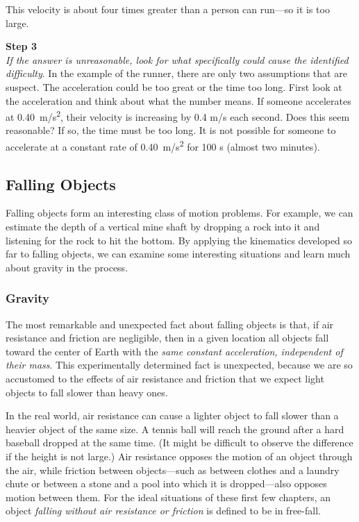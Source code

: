 \documentclass[main-ap-physics.tex]{subfiles}
\begin{document}
This velocity is about four times greater than a person can run---so it is too large.

\vspace{1em}

\textbf{Step 3}\\
\textit{If the answer is unreasonable, look for what specifically could cause the identified difficulty}. In the example of the runner, there are only two assumptions that are suspect. The acceleration could be too great or the time too long. First look at the acceleration and think about what the number means. If someone accelerates at \SI{0.40}{m/s^2}, their velocity is increasing by 0.4 m/s each second. Does this seem reasonable? If so, the time must be too long. It is not possible for someone to accelerate at a constant rate of \SI{0.40}{m/s^2} for 100 s (almost two minutes).

\subsection{Falling Objects}

Falling objects form an interesting class of motion problems. For example, we can estimate the depth of a vertical mine shaft by dropping a rock into it and listening for the rock to hit the bottom. By applying the kinematics developed so far to falling objects, we can examine some interesting situations and learn much about gravity in the process.

\subsubsection*{Gravity}

The most remarkable and unexpected fact about falling objects is that, if air resistance and friction are negligible, then in a given location all objects fall toward the center of Earth with the \textit{same constant acceleration, independent of their mass}. This experimentally determined fact is unexpected, because we are so accustomed to the effects of air resistance and friction that we expect light objects to fall slower than heavy ones.

\vspace{1em} %

In the real world, air resistance can cause a lighter object to fall slower than a heavier object of the same size. A tennis ball will reach the ground after a hard baseball dropped at the same time. (It might be difficult to observe the difference if the height is not large.) Air resistance opposes the motion of an object through the air, while friction between objects---such as between clothes and a laundry chute or between a stone and a pool into which it is dropped---also opposes motion between them. For the ideal situations of these first few chapters, an object \textit{falling without air resistance or friction} is defined to be in \gls{free-fall}.
\end{document}
